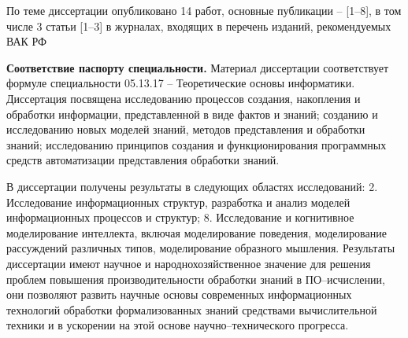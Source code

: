 \documentclass[a4paper]{report}
\begin{document}
По теме диссертации опубликовано 14 работ, основные публикации -- [1--8], в том числе 3 статьи [1--3] в журналах, входящих в перечень изданий, рекомендуемых ВАК РФ


\textbf{Соответствие паспорту специальности.}
Материал диссертации соответствует формуле специальности 05.13.17 -- Теоретические основы информатики. Диссертация посвящена исследованию процессов создания, накопления и обработки информации, представленной в виде фактов и знаний; созданию и исследованию новых моделей знаний, методов представления и обработки знаний; исследованию принципов создания и функционирования программных средств автоматизации представления обработки знаний.

В диссертации получены результаты в следующих областях исследований: 2. Исследование информационных структур, разработка и анализ моделей информационных процессов и структур; 8. Исследование и когнитивное моделирование интеллекта, включая моделирование поведения, моделирование рассуждений различных типов, моделирование образного мышления. Результаты диссертации имеют научное и народнохозяйственное значение для решения проблем повышения производительности обработки знаний в ПО--исчислении, они позволяют развить научные основы современных информационных технологий обработки формализованных знаний средствами вычислительной техники и в ускорении на этой основе на\-уч\-но--тех\-ни\-чес\-ко\-го прогресса.



\end{document}
